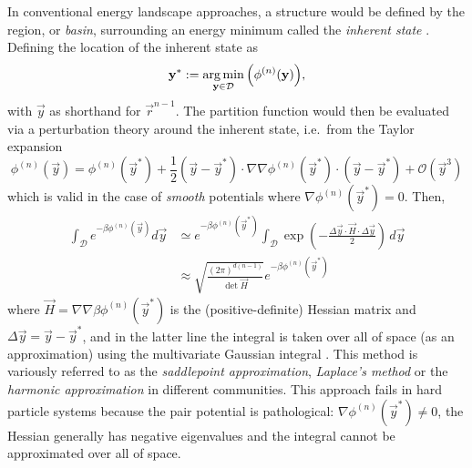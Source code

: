 \documentclass[11pt,twoside]{report}
\begin{document}
In conventional energy landscape approaches, a structure%
would be defined by the region, or \emph{basin}, surrounding an energy minimum called the \emph{inherent state} \cite{StillingerPRA1982,StillingerS1995,Wales2004}.
Defining the location of the inherent state as
\begin{equation*}
  \boldsymbol{\mathbf{y}}^*
  :=
  \operatorname*{arg\,min}_{\boldsymbol{\mathbf{y}} \in \mathcal{D}}{\left( \phi^{(n)}(\boldsymbol{\mathbf{y}}) \right)},
\end{equation*}
with $\vec{y}$ as shorthand for $\vec{r}^{n-1}$.
The partition function would then be evaluated via a perturbation theory around the inherent state, i.e.\ from the Taylor expansion \cite{Wales2004}
\begin{equation*}
  \phi^{(n)}(\vec{y})
  =
  \phi^{(n)}(\vec{y}^*)
  + \frac{1}{2} (\vec{y} - \vec{y}^*) \cdot
  \nabla\nabla \phi^{(n)}(\vec{y}^*)
  \cdot (\vec{y} - \vec{y}^*)
  + \mathcal{O}(\vec{y}^3)
\end{equation*}
which is valid in the case of \emph{smooth} potentials where $\nabla \phi^{(n)}(\vec{y}^*) = 0$.
Then, \cite{Wales2004}
\begin{equation}\label{eq:harmonic-approximation}
  \begin{split}
    \int_\mathcal{D} e^{-\beta\phi^{(n)}(\vec{y})} d\vec{y}
    &\simeq
    e^{-\beta\phi^{(n)}(\vec{y}^*)}
    \int_\mathcal{D}
    \exp{\left( - \frac{\Delta\vec{y} \cdot \vec{H} \cdot \Delta\vec{y}}{2} \right)}
    \, d\vec{y}
    \\ &\approx
    \sqrt{ \frac{(2\pi)^{d(n-1)}}{\det \vec{H}} }
    e^{-\beta\phi^{(n)}(\vec{y}^*)}
  \end{split}
\end{equation}
where $\vec{H} = \nabla\nabla \beta \phi^{(n)}(\vec{y}^*)$ is the (positive-definite) Hessian matrix and $\Delta \vec{y} = \vec{y} - \vec{y}^*$, and in the latter line the integral is taken over all of space (as an approximation) using the multivariate Gaussian integral%
.
This method is variously referred to as the \emph{saddlepoint approximation}, \emph{Laplace's method} or the \emph{harmonic approximation} in different communities.
This approach fails in hard particle systems because the pair potential is pathological: $\nabla \phi^{(n)}(\vec{y}^*) \ne 0$, the Hessian generally has negative eigenvalues and the integral cannot be approximated over all of space.
\end{document}
